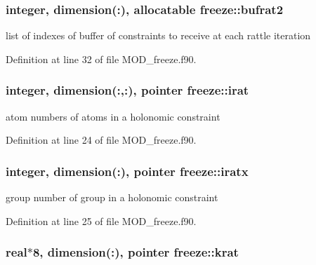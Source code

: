 \hypertarget{classfreeze_a5a0cbbf569f96d7c28eaa7990e99b858}{
\subsubsection[{bufrat2}]{\setlength{\rightskip}{0pt plus 5cm}integer, dimension(\-:), allocatable freeze\-::bufrat2}}\label{classfreeze_a5a0cbbf569f96d7c28eaa7990e99b858}


list of indexes of buffer of constraints to receive at each rattle iteration 



Definition at line 32 of file M\-O\-D\-\_\-freeze.\-f90.

\hypertarget{classfreeze_a9443d6b563ebf61724437362386a6a16}{
\subsubsection[{irat}]{\setlength{\rightskip}{0pt plus 5cm}integer, dimension(\-:,\-:), pointer freeze\-::irat}}\label{classfreeze_a9443d6b563ebf61724437362386a6a16}


atom numbers of atoms in a holonomic constraint 



Definition at line 24 of file M\-O\-D\-\_\-freeze.\-f90.

\hypertarget{classfreeze_af92fddc0d1311be14c0235f71949701c}{
\subsubsection[{iratx}]{\setlength{\rightskip}{0pt plus 5cm}integer, dimension(\-:), pointer freeze\-::iratx}}\label{classfreeze_af92fddc0d1311be14c0235f71949701c}


group number of group in a holonomic constraint 



Definition at line 25 of file M\-O\-D\-\_\-freeze.\-f90.

\hypertarget{classfreeze_a04f100032ce74e94a2c4845299dc9f6b}{
\subsubsection[{krat}]{\setlength{\rightskip}{0pt plus 5cm}real$\ast$8, dimension(\-:), pointer freeze\-::krat}}\label{classfreeze_a04f100032ce74e94a2c4845299dc9f6b}


